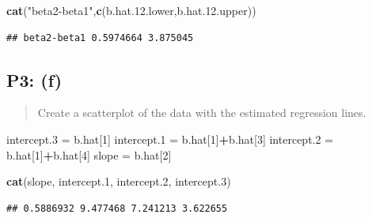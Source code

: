 \documentclass[
]{article}
\newenvironment{Shaded}{\begin{snugshade}}{\end{snugshade}}
\newcommand{\DecValTok}[1]{\textcolor[rgb]{0.00,0.00,0.81}{#1}}
\newcommand{\FloatTok}[1]{\textcolor[rgb]{0.00,0.00,0.81}{#1}}
\newcommand{\FunctionTok}[1]{\textcolor[rgb]{0.13,0.29,0.53}{\textbf{#1}}}
\newcommand{\NormalTok}[1]{#1}
\newcommand{\OtherTok}[1]{\textcolor[rgb]{0.56,0.35,0.01}{#1}}
\newcommand{\SpecialCharTok}[1]{\textcolor[rgb]{0.81,0.36,0.00}{\textbf{#1}}}
\newcommand{\StringTok}[1]{\textcolor[rgb]{0.31,0.60,0.02}{#1}}
\begin{document}
\begin{Shaded}
\begin{Highlighting}[]
\FunctionTok{cat}\NormalTok{(}\StringTok{"beta2{-}beta1"}\NormalTok{,}\FunctionTok{c}\NormalTok{(b.hat.}\FloatTok{12.}\NormalTok{lower,b.hat.}\FloatTok{12.}\NormalTok{upper))}
\end{Highlighting}
\end{Shaded}

\begin{verbatim}
## beta2-beta1 0.5974664 3.875045
\end{verbatim}

\hypertarget{p3-f}{%
\subsection{P3: (f)}\label{p3-f}}

\begin{quote}
Create a scatterplot of the data with the estimated regression lines.
\end{quote}

\begin{Shaded}
\begin{Highlighting}[]
\NormalTok{intercept}\FloatTok{.3} \OtherTok{=}\NormalTok{ b.hat[}\DecValTok{1}\NormalTok{]}
\NormalTok{intercept}\FloatTok{.1} \OtherTok{=}\NormalTok{ b.hat[}\DecValTok{1}\NormalTok{]}\SpecialCharTok{+}\NormalTok{b.hat[}\DecValTok{3}\NormalTok{]}
\NormalTok{intercept}\FloatTok{.2} \OtherTok{=}\NormalTok{ b.hat[}\DecValTok{1}\NormalTok{]}\SpecialCharTok{+}\NormalTok{b.hat[}\DecValTok{4}\NormalTok{]}
\NormalTok{slope }\OtherTok{=}\NormalTok{ b.hat[}\DecValTok{2}\NormalTok{]}

\FunctionTok{cat}\NormalTok{(slope, intercept}\FloatTok{.1}\NormalTok{, intercept}\FloatTok{.2}\NormalTok{, intercept}\FloatTok{.3}\NormalTok{)}
\end{Highlighting}
\end{Shaded}

\begin{verbatim}
## 0.5886932 9.477468 7.241213 3.622655
\end{verbatim}
\end{document}
